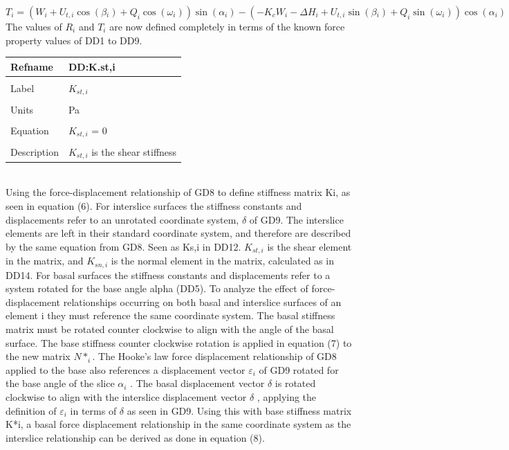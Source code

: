 \documentclass[12pt]{article}
\begin{document}
\begin{equation}
T_{i}=\left(W_{i}+U_{t,i}\cos\left(\beta{}_{i}\right)+Q_{i}\cos\left(\omega{}_{i}\right)\right)\sin\left(\alpha{}_{i}\right)-\left(-K_{c}W_{i}-\Delta{}H_{i}+U_{t,i}\sin\left(\beta{}_{i}\right)+Q_{i}\sin\left(\omega{}_{i}\right)\right)\cos\left(\alpha{}_{i}\right)
\end{equation}
The values of $R_{i}$ and $T_{i}$ are now defined completely in terms of the known force property values of DD1 to DD9.
~\newline
\noindent \begin{minipage}{\textwidth}
\begin{tabular}{p{} p{}}
\toprule \textbf{Refname} & \textbf{DD:K.st,i}
\label{DD:K.st,i}
\\ \midrule \\
Label & $K_{st,i}$
\\ \midrule \\
Units & Pa
\\ \midrule \\
Equation & $K_{st,i}$ = $0$
\\ \midrule \\
Description & $K_{st,i}$ is the shear stiffness
\\ \bottomrule \end{tabular}
\end{minipage}\\
Using the force-displacement relationship of GD8 to define stiffness matrix Ki, as seen in equation (6).
For interslice surfaces the stiffness constants and displacements refer to an unrotated coordinate system, $\delta{}$ of GD9. The interslice elements are left in their standard coordinate system, and therefore are described by the same equation from GD8. Seen as Ks,i in DD12. $K_{st,i}$ is the shear element in the matrix, and $K_{sn,i}$ is the normal element in the matrix, calculated as in DD14.
For basal surfaces the stiffness constants and displacements refer to a system rotated for the base angle alpha (DD5). To analyze the effect of force-displacement relationships occurring on both basal and interslice surfaces of an element i they must reference the same coordinate system. The basal stiffness matrix must be rotated counter clockwise to align with the angle of the basal surface. The base stiffness counter clockwise rotation is applied in equation (7) to the new matrix $N*_{i}$.
The Hooke's law force displacement relationship of GD8 applied to the base also references a displacement vector $\varepsilon{}_{i}$ of GD9 rotated for the base angle of the slice $\alpha{}_{i}$ . The basal displacement vector $\delta{}$ is rotated clockwise to align with the interslice displacement vector $\delta{}$ , applying the definition of $\varepsilon{}_{i}$ in terms of $\delta{}$ as seen in GD9. Using this with base stiffness matrix K*i, a basal force displacement relationship in the same coordinate system as the interslice relationship can be derived as done in equation (8).
\end{document}
